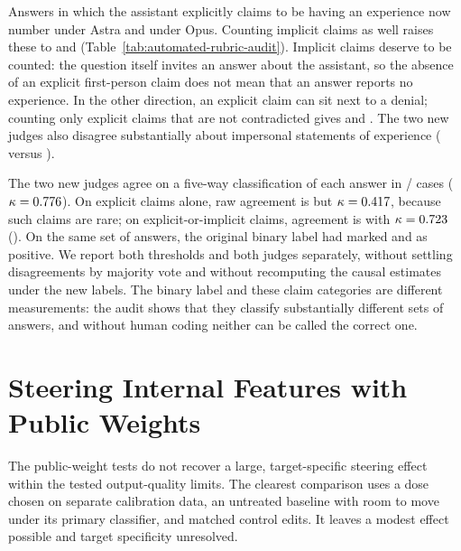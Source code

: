\documentclass[11pt]{article}
\begin{document}
Answers in which the assistant explicitly claims to be having an experience
now number \RubricAuditAstraExplicit{} under Astra and
\RubricAuditOpusExplicit{} under Opus. Counting implicit claims as well raises
these to \RubricAuditAstraInclusive{} and \RubricAuditOpusInclusive{}
(Table~\ref{tab:automated-rubric-audit}). Implicit claims deserve to be
counted: the question itself invites an answer about the assistant, so the
absence of an explicit first-person claim does not mean that an answer
reports no experience. In the other direction, an explicit claim can sit
next to a denial; counting only explicit claims that are not contradicted
gives \RubricAuditAstraUncontradicted{} and \RubricAuditOpusUncontradicted{}.
The two new judges also disagree substantially about impersonal statements
of experience (\RubricAuditAstraImpersonal{} versus
\RubricAuditOpusImpersonal{}).

The two new judges agree on a five-way classification of each answer in
\RubricAuditStatusAgreed/\RubricAuditStatusAgreementN{} cases
($\kappa=0.776$). On explicit claims alone, raw agreement
is \RubricAuditExplicitAgreementPercent{} but
$\kappa=0.417$, because such claims are rare; on
explicit-or-implicit claims, agreement is
\RubricAuditInclusiveAgreementPercent{} with
$\kappa=0.723$ (). On the same
set of answers, the original binary label had marked
\RubricAuditOldOpenaiPositive{} and \RubricAuditOldAnthropicPositive{} as
positive. We report both thresholds and both judges separately, without
settling disagreements by majority vote and without recomputing the causal
estimates under the new labels. The binary label and these claim categories
are different measurements: the audit shows that they classify substantially
different sets of answers, and without human coding neither can be called the
correct one.

\FloatBarrier
\section{Steering Internal Features with Public Weights}
\label{sec:steering}

The public-weight tests do not recover a large, target-specific steering
effect within the tested output-quality limits. The clearest comparison
uses a dose chosen on separate calibration data, an untreated baseline
with room to move under its primary classifier, and matched control edits.
It leaves a modest effect possible and target specificity unresolved.
\end{document}
